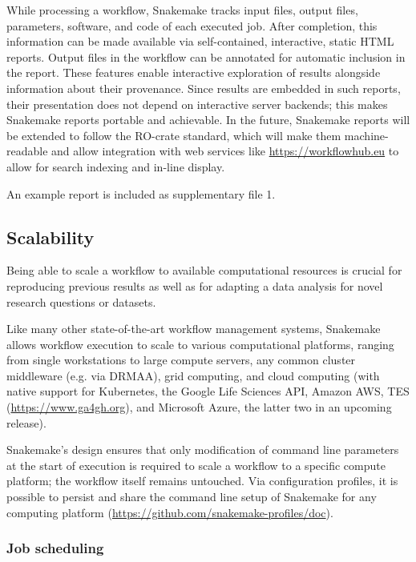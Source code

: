 \documentclass[parskip=half]{scrartcl}
\let\plainurl\url
\renewcommand{\url}[1]{\protect\plainurl{#1}}
\begin{document}
While processing a workflow, Snakemake tracks input files, output files, parameters, software, and code of each executed job.
After completion, this information can be made available via self-contained, interactive, static HTML reports.
Output files in the workflow can be annotated for automatic inclusion in the report.
These features enable interactive exploration of results alongside information about their provenance.
Since results are embedded in such reports, their presentation does not depend on interactive server backends; this makes Snakemake reports portable and achievable.
In the future, Snakemake reports will be extended to follow the RO-crate standard, which will make them machine-readable and allow integration with web services like \url{https://workflowhub.eu} to allow for search indexing and in-line display.

An example report is included as supplementary file 1.

\subsection{Scalability}\label{sec:scalability}

Being able to scale a workflow to available computational resources is crucial for reproducing previous results as well as for adapting a data analysis for novel research questions or datasets.

Like many other state-of-the-art workflow management systems, Snakemake allows workflow execution to scale to various computational platforms, ranging from single workstations to large compute servers, any common cluster middleware (e.g. via DRMAA), grid computing, and cloud computing (with native support for Kubernetes, the Google Life Sciences API, Amazon AWS, TES (\url{https://www.ga4gh.org}), and Microsoft Azure, the latter two in an upcoming release).

Snakemake's design ensures that only modification of command line parameters at the start of execution is required to scale a workflow to a specific compute platform; the workflow itself remains untouched.
Via configuration profiles, it is possible to persist and share the command line setup of Snakemake for any computing platform (\url{https://github.com/snakemake-profiles/doc}).

\subsubsection{Job scheduling}\label{sec:scheduling}
\end{document}
